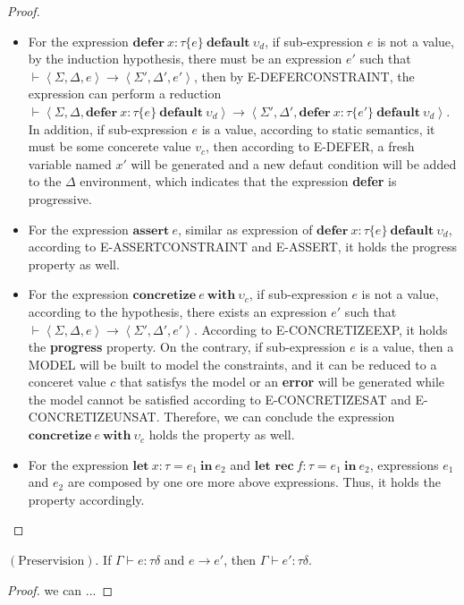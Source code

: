 \begin{proof}
\begin{itemize}
            \item For the expression $\textbf{defer}~x:\tau\{e\}~\textbf{default}~\upsilon_d$, if sub-expression $e$ is not a value, by the induction hypothesis, there must be an expression $e' $ such that $\vdash\left\langle\Sigma, \Delta, e\right\rangle\rightarrow\left\langle\Sigma',\Delta',e'\right\rangle$, then by E-DEFERCONSTRAINT, the expression can perform a reduction $\vdash\left\langle\Sigma, \Delta, \textbf{defer}~x: \tau\{e\}~\textbf{default}~\upsilon_d \right\rangle\rightarrow\left\langle\Sigma',\Delta',\textbf{defer}~x:\tau\{e'\}~\textbf{default}~\upsilon_d\right\rangle$. In addition, if sub-expression $e$ is a value, according to static semantics, it must be some concerete value $v_c$, then according to E-DEFER, a fresh variable named $x'$ will be generated and a new defaut condition will be added to the $\Delta$ environment, which indicates that the expression \textbf{defer}  is progressive.
            \item For the expression $\textbf{assert}~e$, similar as expression of $\textbf{defer}~x:\tau\{e\}~\textbf{default}~\upsilon_d$, according to E-ASSERTCONSTRAINT and E-ASSERT, it holds the progress property as well.
            \item For the expression $\textbf{concretize}~e~\textbf{with}~\upsilon_c$, if sub-expression $e$ is not a value, according to the hypothesis, there exists an expression $e'$ such that  $\vdash\left\langle\Sigma, \Delta, e\right\rangle\rightarrow\left\langle\Sigma',\Delta',e'\right\rangle$. According to E-CONCRETIZEEXP, it holds the \textbf{progress} property. On the contrary, if sub-expression $e$ is a value, then a MODEL will be built to model the constraints, and it can be reduced to a conceret value $c$ that satisfys the model or an \textbf{error} will be generated while the model cannot be satisfied according to E-CONCRETIZESAT and E-CONCRETIZEUNSAT. Therefore, we can conclude the expression $\textbf{concretize}~e~\textbf{with}~\upsilon_c$ holds the property as well.
            \item For the expression $\textbf{let}~x:\tau=e_1~\textbf{in}~e_2$ and $\textbf{let rec}~f:\tau=e_1~\textbf{in}~e_2$, expressions $e_1$ and $e_2$ are composed by one ore more above expressions. Thus, it holds the property accordingly.
        \end{itemize}
    \end{proof}
    
    \begin{theorem}
        $\mathrm{(Preservision).}$ If $\Gamma\vdash e:\tau\delta$ and $e\rightarrow e'$, then $\Gamma\vdash e':\tau\delta$. 
    \end{theorem}
    \begin{proof}
        we can ...
    \end{proof}
